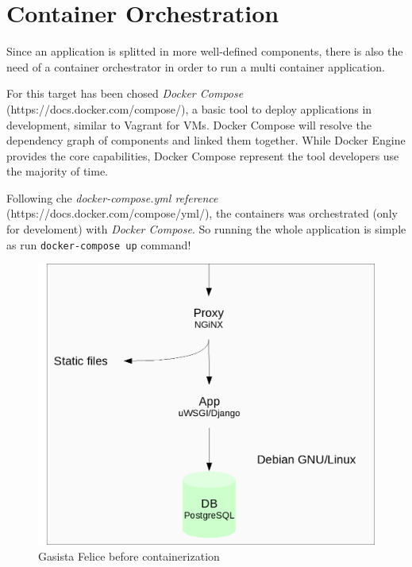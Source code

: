 \section{Container Orchestration}\label{container-orchestration}

Since an application is splitted in more well-defined components, there
is also the need of a container orchestrator in order to run a multi
container application.

For this target has been chosed \emph{Docker Compose}
(https://docs.docker.com/compose/), a basic tool to deploy applications
in development, similar to Vagrant for VMs. Docker Compose will resolve
the dependency graph of components and linked them together. While
Docker Engine provides the core capabilities, Docker Compose represent
the tool developers use the majority of time.

Following che \emph{docker-compose.yml reference}
(https://docs.docker.com/compose/yml/), the containers was orchestrated
(only for develoment) with \emph{Docker Compose}. So running the whole
application is simple as run \texttt{docker-compose\ up} command!

\begin{figure}[htbp]
\centering
\includegraphics{media/ch3-gf_old.png}
\caption{Gasista Felice before containerization}
\end{figure}

